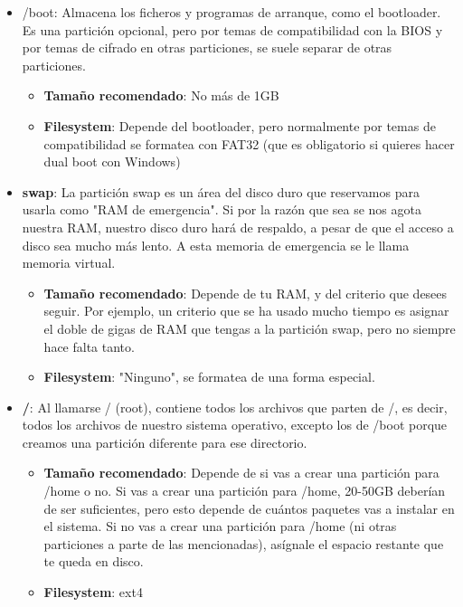 \begin{itemize}
    \item /boot: Almacena los ficheros y programas de arranque, como el bootloader. Es una partición opcional, pero por temas de compatibilidad con la BIOS y por temas de cifrado en otras particiones, se suele separar de otras particiones.
    \begin{itemize}
        \item \textbf{Tamaño recomendado}: No más de 1GB
        \item \textbf{Filesystem}: Depende del bootloader, pero normalmente por temas de compatibilidad se formatea con FAT32 (que es obligatorio si quieres hacer dual boot  con Windows)
    \end{itemize}

    \item \textbf{swap}: La partición swap es un área del disco duro que reservamos para usarla como "RAM de emergencia". Si por la razón que sea se nos agota nuestra RAM, nuestro disco duro hará de respaldo, a pesar de que el acceso a disco sea mucho más lento. A esta memoria de emergencia se le llama memoria virtual.
    \begin{itemize}
        \item \textbf{Tamaño recomendado}: Depende de tu RAM, y del criterio que desees seguir. Por ejemplo, un criterio que se ha usado mucho tiempo es asignar el doble de gigas de RAM que tengas a la partición swap, pero no siempre hace falta tanto.
        \item \textbf{Filesystem}: "Ninguno", se formatea de una forma especial.
    \end{itemize}

    \item \textbf{/}: Al llamarse / (root), contiene todos los archivos que parten de /, es decir, todos los archivos de nuestro sistema operativo, excepto los de /boot porque creamos una partición diferente para ese directorio.

    \begin{itemize}
        \item \textbf{Tamaño recomendado}: Depende de si vas a crear una partición para /home o no. Si vas a crear una partición para /home, 20-50GB deberían de ser suficientes, pero esto depende de cuántos paquetes vas a instalar en el sistema. Si no vas a crear una partición para /home (ni otras particiones a parte de las mencionadas), asígnale el espacio restante que te queda en disco.
        \item \textbf{Filesystem}: ext4
    \end{itemize}


\end{itemize}
